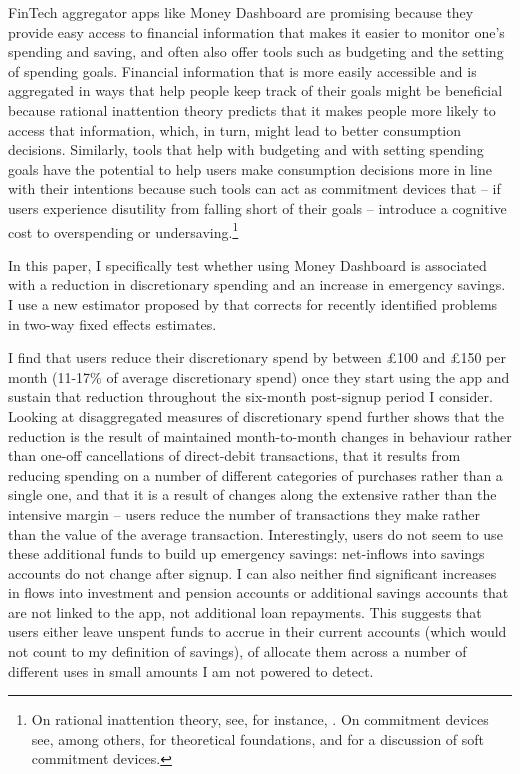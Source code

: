 FinTech aggregator apps like Money Dashboard are promising because they provide
easy access to financial information that makes it easier to monitor one's
spending and saving, and often also offer tools such as budgeting and the
setting of spending goals. Financial information that
is more easily accessible and is aggregated in ways that help people keep track
of their goals might be beneficial because rational inattention theory predicts
that it makes people more likely to access that information, which, in turn,
might lead to better consumption decisions. Similarly, tools that help with
budgeting and with setting spending goals have the potential to help users make
consumption decisions more in line with their intentions because such tools can
act as commitment devices that -- if users experience disutility from falling
short of their goals -- introduce a cognitive cost to overspending or
undersaving.\footnote{On rational inattention theory, see, for instance,
    \citet{brunnermeier2008wealth, dellavigna2009psychology,
    sims2003implications}. On commitment devices see, among others,
    \citet{thaler1981economic, laibson1997golden, o1999doing} for theoretical
    foundations, and \citet{beshears2016beyond, hsiaw2013goal} for a discussion
of soft commitment devices.}

In this paper, I specifically test whether using Money Dashboard is associated
with a reduction in discretionary spending and an increase in emergency
savings. I use a new estimator proposed by \citet{callaway2021difference} that
corrects for recently identified problems in two-way fixed effects estimates.

I find that users reduce their discretionary spend by between \pounds100 and
\pounds150 per month (11-17\% of average discretionary spend) once they start
using the app and sustain that reduction throughout the six-month post-signup
period I consider. Looking at disaggregated measures of discretionary spend
further shows that the reduction is the result of maintained month-to-month
changes in behaviour rather than one-off cancellations of direct-debit
transactions, that it results from reducing spending on a number of different
categories of purchases rather than a single one, and that it is a result of
changes along the extensive rather than the intensive margin -- users reduce
the number of transactions they make rather than the value of the average
transaction.  Interestingly, users do not seem to use these additional funds to
build up emergency savings: net-inflows into savings accounts do not change
after signup. I can also neither find significant increases in flows into
investment and pension accounts or additional savings accounts that are not
linked to the app, not additional loan repayments. This suggests that users
either leave unspent funds to accrue in their current accounts (which would not
count to my definition of savings), of allocate them across a number of
different uses in small amounts I am not powered to detect.

